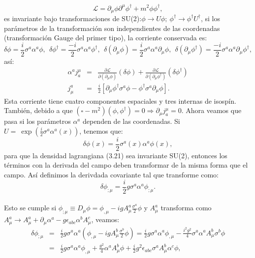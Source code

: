 \begin{equation}
\mathcal{L}=\partial_{\mu}\phi\partial^{\mu}\phi^{\dagger}+m^{2}\phi\phi^{\dagger},
\end{equation}
es invariante bajo transformaciones de SU(2):$\phi\to U\phi;\ \phi^\dagger\to\phi^\dagger U^\dagger$, si los parámetros de la transformación son independientes de las coordenadas (transformación Gauge del primer tipo), la corriente conservada es:
\begin{equation}
\delta\phi=\frac{i}{2}\sigma^{a}\alpha^{a}\phi,\ \ \delta\phi^{\dagger}=\frac{-i}{2}\sigma^{a}\alpha^{a}\phi^{\dagger},\ \ \delta(\partial_{\mu}\phi)=\frac{i}{2}\sigma^{a}\alpha^{a}\partial_{\mu}\phi,\ \ \delta(\partial_{\mu}\phi^{\dagger})=\frac{-i}{2}\sigma^{a}\alpha^{a}\partial_{\mu}\phi^{\dagger},
\end{equation}
así:
\begin{eqnarray}
\nonumber \alpha^{a}j_{a}^{\mu}&=&\frac{\partial\mathcal{L}}{\partial(\partial_{\mu}\phi)}(\delta\phi)+\frac{\partial\mathcal{L}}{\partial(\partial_{\mu}\phi^{\dagger})}(\delta\phi^{\dagger})\\
j^{a}_{\mu}&=& \frac{i}{2}[\partial_{\mu}\phi^{\dagger}\sigma^{a}\phi-\phi^{\dagger}\sigma^{a}\partial_{\mu}\phi].
\end{eqnarray}
Esta corriente tiene cuatro componentes espaciales y tres internas de isospín. También, debido a que $(\square-m^2)(\phi,\phi^\dagger)=0\Rightarrow \partial_\mu j^{\mu}_{a}=0$. Ahora veamos que pasa si los parámetros $\alpha^a$ dependen de las coordenadas. Si $U=\ \exp\left(\frac{i}{2}\sigma^a\alpha^a(x)\right)$, tenemos que:
\begin{equation}
\delta\phi(x)=\frac{i}{2}\sigma^{a}(x)\alpha^{a}\phi(x),
\end{equation}
para que la densidad lagrangiana (3.21) sea invariante SU(2), entonces los términos con la derivada del campo deben transformar de la misma forma que el campo. Así definimos la derivdada covariante tal que transforme como:
\begin{equation}
\delta\phi_{;\mu}=\frac{i}{2}g\sigma^{a}\alpha^{a}\phi_{;\mu}.
\end{equation}  
\\
Esto se cumple si $\phi_{;\mu}\equiv D_{\mu}\phi=\phi_{,\mu}-igA_{\mu}^{a}\frac{\sigma^{a}}{2}\phi$ y $A_{\mu}^{a}$ transforma como $A_{\mu}^{a}\to A_{\mu}^{a}+\partial_{\mu}\alpha^{a}-g\epsilon_{abc}\alpha^{b}A_{\mu}^{c}$, veamos:
\begin{eqnarray}
\nonumber \delta\phi_{;\mu}&=&\frac{i}{2}g\sigma^{a}\alpha^{a}(\phi_{,\mu}-igA_{\mu}^{b}\frac{\sigma^{b}}{2}\phi)=\frac{i}{2}g\sigma^{a}\alpha^{a}\phi_{,\mu}-\frac{i^{2}g^{2}}{4}\sigma^{a}\alpha^{a}A_{\mu}^{b}\sigma^{b}\phi\\
&=&\frac{i}{2}g\sigma^{a}\alpha^{a}\phi_{,\mu}+\frac{g^{2}}{4}\alpha^{a}A_{\mu}^{b}\phi+\frac{i}{2}g^{2}\epsilon_{abc}\sigma^{a}A_{\mu}^{b}\alpha^{c}\phi ,
\end{eqnarray}
